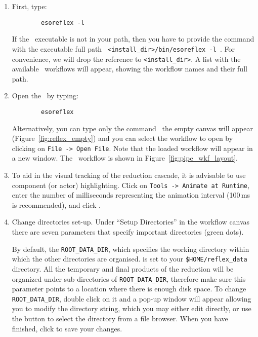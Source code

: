 \documentclass[pdftex,a4paper,twoside,11pt]{article}
\begin{document}
\begin{enumerate}
  \item First, type:
        \begin{verbatim}
        esoreflex -l
        \end{verbatim}

    If the \ executable is not in your path, then you have
      to provide the command with the executable full path {\tt
        <install\_dir>/bin/esoreflex -l }. For convenience, we will
      drop the reference to {\tt <install\_dir>}. A list with the
      available \ workflows will appear, showing the workflow
      names and their full path.

   \item Open the \wkfname\ by typing:

\bigskip

      {\tt \ \ \ \ \ \ \ \ esoreflex} \wkfn {\tt \&}

\bigskip

      Alternatively, you can type only the command \, the empty
      canvas will appear (Figure~\ref{fig:reflex_empty}) and you can
      select the workflow to open by clicking on {\tt File -> Open
        File}. Note that the loaded workflow will appear in a new
      window. The \wkfname\ workflow is shown in
      Figure~\ref{fig:pipe_wkf_layout}. 

  \item To aid in the visual tracking of the reduction cascade, it is advisable
  to use component (or actor) highlighting. Click on {\tt Tools -> Animate at
  Runtime}, enter the number of milliseconds representing the animation
  interval (100\,ms is recommended), and click .

\item Change directories set-up. Under ``Setup Directories'' in the
  workflow canvas there are seven parameters that specify important
  directories (green dots).

  By default, the {\tt ROOT\_DATA\_DIR}, which specifies the working
  directory within which the other directories are organised. is set
  to your {\tt \$HOME/reflex\_data} directory. All the temporary and
  final products of the reduction will be organized under
  sub-directories of {\tt ROOT\_DATA\_DIR}, therefore make sure this
  parameter points to a location where there is enough disk space. To
  change {\tt ROOT\_DATA\_DIR}, double click on it and a pop-up window
  will appear allowing you to modify the directory string, which you
  may either edit directly, or use the  button to
  select the directory from a file browser.  When you have finished,
  click  to save your changes.


\end{enumerate}
\end{document}
